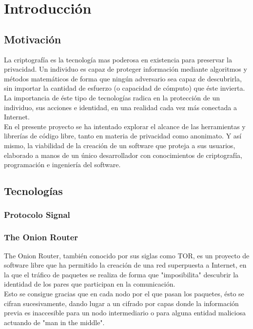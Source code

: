 \chapter{Introducción}

\section {Motivación}

La criptografía es la tecnología mas poderosa en existencia para preservar la privacidad. Un individuo es capaz de proteger información mediante algoritmos y métodos matemáticos de forma que ningún adversario sea capaz de descubrirla, sin importar la cantidad de esfuerzo (o capacidad de cómputo) que éste invierta. \\

La importancia de éste tipo de tecnologías radica en la protección de un individuo, sus acciones e identidad, en una realidad cada vez más conectada a Internet. \\

En el presente proyecto se ha intentado explorar el alcance de las herramientas y librerías de código libre, tanto en materia de privacidad como anonimato. Y así mismo, la viabilidad de la creación de un software que proteja a sus usuarios, elaborado a manos de un único desarrollador con conocimientos de criptografía, programación e ingeniería del software.


\section {Tecnologías}
\subsection {Protocolo Signal}
\subsection {The Onion Router}

The Onion Router, también conocido por sus siglas como TOR, es un proyecto de software libre que ha permitido la creación de una red superpuesta a Internet, en la que el tráfico de paquetes se realiza de forma que "imposibilita" descubrir la identidad de los pares que participan en la comunicación. \\

Esto se consigue gracias que en cada nodo por el que pasan los paquetes, ésto se cifran sucesivamente, dando lugar a un cifrado por capas donde la información previa es inaccesible para un nodo intermediario o para alguna entidad maliciosa actuando de "man in the middle". \\


